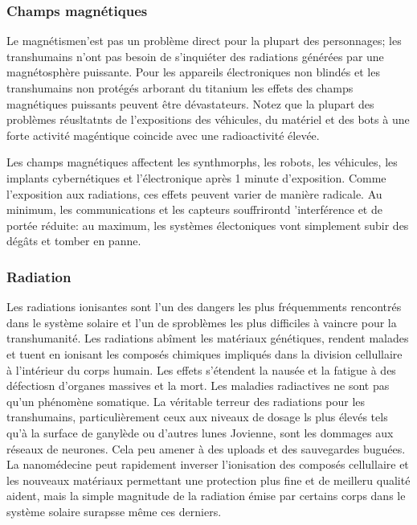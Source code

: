 \subsubsection{Champs magnétiques} 

Le magnétismen'est pas un problème direct pour la plupart des personnages; les transhumains n'ont pas besoin de s'inquiéter des radiations générées par une magnétosphère puissante. Pour les appareils électroniques non blindés et les transhumains non protégés arborant du titanium les effets des champs magnétiques puissants peuvent être dévastateurs. Notez que la plupart des problèmes réusltatnts de l'expositions des véhicules, du matériel et des bots à une forte activité magéntique coincide avec une radioactivité élevée. 

Les champs magnétiques affectent les synthmorphs, les robots, les véhicules, les implants cybernétiques et l'électronique après 1 minute d'exposition. Comme l'exposition aux radiations, ces effets peuvent varier de manière radicale. Au minimum, les communications et les capteurs souffrirontd 'interférence et de portée réduite: au maximum, les systèmes électoniques vont simplement subir des dégâts et tomber en panne. 

\subsubsection{Radiation} 

Les radiations ionisantes sont l'un des dangers les plus fréquemments rencontrés dans le système solaire et l'un de sproblèmes les plus difficiles à vaincre pour la transhumanité. Les radiations abîment les matériaux génétiques, rendent malades et tuent en ionisant les composés chimiques impliqués dans la division cellullaire à l'intérieur du corps humain. Les effets s'étendent la nausée et la fatigue à des défectiosn d'organes massives et la mort. Les maladies radiactives ne sont pas qu'un phénomène somatique. La véritable terreur des radiations pour les transhumains, particulièrement ceux aux niveaux de dosage ls plus élevés tels qu'à la surface de ganylède ou d'autres lunes Jovienne, sont les dommages aux réseaux de neurones. Cela peu amener à des uploads et des sauvegardes buguées. La nanomédecine peut rapidement inverser l'ionisation des composés cellullaire et les nouveaux matériaux permettant une protection plus fine et de meilleru qualité aident, mais la simple magnitude de la radiation émise par certains corps dans le système solaire surapsse même ces derniers. 

